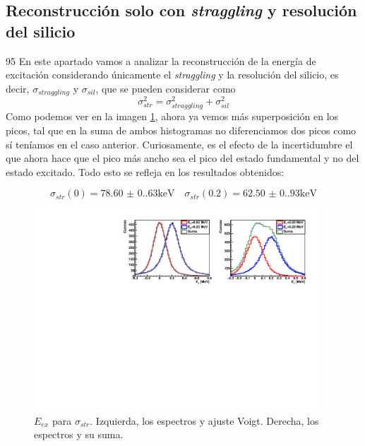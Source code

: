 \subsection{Reconstrucción solo con \textit{straggling}  y resolución del silicio}
95
En este apartado vamos a analizar la reconstrucción de la energía de excitación considerando únicamente el \textit{straggling} y la resolución del silicio, es decir, $\sigma_{straggling}$ y $\sigma_{sil}$, que se pueden considerar como
\begin{equation}
    \sigma_{str}^2 = \sigma_{straggling}^2 + \sigma_{sil}^2
\end{equation}
Como podemos ver en la imagen \cref{Fig:05-RecExcIdx1}, ahora ya vemos más superposición en los picos, tal que en la suma de ambos histogramas no diferenciamos dos picos como sí teníamos en el caso anterior. Curiosamente, es el efecto de la incertidumbre el que ahora hace que el pico más ancho sea el pico del estado fundamental y no del estado excitado. Todo esto se refleja en los resultados obtenidos: 

\begin{equation}
    \sigma_{str} (0) = \num{78.60(0.63)} \text{keV} \quad 
    \sigma_{str} (0.2) = \num{62.50(0.93)} \text{keV}
\end{equation} 

\begin{figure}[H]
    \centering
    \includegraphics[width=0.95\textwidth]{Imagenes/Rec_incIdx1_single.pdf}
    \caption{$E_{ex}$ para $\sigma_{str}$. Izquierda, los espectros y ajuste Voigt. Derecha, los espectros y su suma.}
    \label{Fig:05-RecExcIdx1}
\end{figure}

